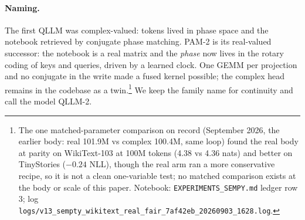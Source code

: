 \documentclass[11pt]{article}
\newcommand{\model}{QLLM-2}
\newcommand{\arch}{PAM-2}
\begin{document}
\paragraph{Naming.} The first QLLM \citep{vishwakarma2026pam} was complex-valued: tokens lived in phase space and the notebook retrieved by conjugate phase matching. \arch{} is its real-valued successor: the notebook is a real matrix and the \emph{phase} now lives in the rotary coding of keys and queries, driven by a learned clock. One GEMM per projection and no conjugate in the write made a fused kernel possible; the complex head remains in the codebase as a twin.\footnote{The one matched-parameter comparison on record (September 2026, the earlier body: real 101.9M vs complex 100.4M, same loop) found the real body at parity on WikiText-103 at 100M tokens (4.38 vs 4.36 nats) and better on TinyStories ($-0.24$ NLL), though the real arm ran a more conservative recipe, so it is not a clean one-variable test; no matched comparison exists at the body or scale of this paper. Notebook: \texttt{EXPERIMENTS\_SEMPY.md} ledger row 3; log \texttt{logs/v13\_sempty\_wikitext\_real\_fair\_7af42eb\_20260903\_1628.log}.} We keep the family name for continuity and call the model \model.
\end{document}
